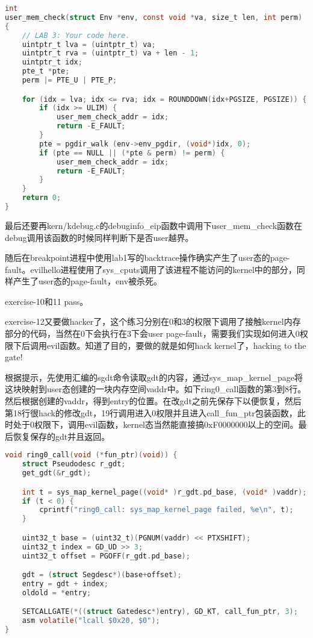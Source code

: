 \documentclass[11pt,a4paper]{article}
\begin{document}
\setmainfont{Consolas}
\begin{lstlisting}[language={C},firstnumber=1,title=kern/pmap.c]
int
user_mem_check(struct Env *env, const void *va, size_t len, int perm)
{
	// LAB 3: Your code here.
	uintptr_t lva = (uintptr_t) va;
	uintptr_t rva = (uintptr_t) va + len - 1;
	uintptr_t idx;
	pte_t *pte;
	perm |= PTE_U | PTE_P;

	for (idx = lva; idx <= rva; idx = ROUNDDOWN(idx+PGSIZE, PGSIZE)) {
		if (idx >= ULIM) {
			user_mem_check_addr = idx;
			return -E_FAULT;
		}
		pte = pgdir_walk (env->env_pgdir, (void*)idx, 0);
		if (pte == NULL || (*pte & perm) != perm) {
			user_mem_check_addr = idx;		
			return -E_FAULT;
		}
	}
	return 0;
}
\end{lstlisting}
\setmainfont[BoldFont=黑体]{宋体}

最后还要再kern/kdebug.c的debuginfo\_eip函数中调用下user\_mem\_check函数在debug调用该函数的时候同样判断下是否user越界。

随后在breakpoint进程中使用lab1写的backtrace操作确实产生了user态的page-fault。evilhello进程使用了sys\_cputs调用了该进程不能访问的kernel中的部分，同样产生了user态的page-fault，env被杀死。

exercise-10和11 pass。

exercise-12又要做hacker了，这个练习分别在0和3的权限下调用了接触kernel内存部分的代码，当然在0下会执行在3下会user page-fault，需要我们实现如何进入0权限下后调用evil函数。知道了目的，要做的就是如何hack kernel了，hacking to the gate!

根据提示，先使用汇编的sgdt命令读取gdt的内容，通过sys\_map\_kernel\_page将这块映射到user态创建的一块内存空间vaddr中。如下ring0\_call函数的第3到8行。然后根据创建的vaddr，得到entry的位置。在改gdt之前先保存下以便恢复，然后第18行很hack的修改gdt，19行调用进入0权限并且进入call\_fun\_ptr包装函数，此时处于0权限下，调用evil函数，kernel态当然能直接搞0xF0000000以上的空间。最后恢复保存的gdt并且返回。

\setmainfont{Consolas}
\begin{lstlisting}[language={C},firstnumber=1,title=user/evilhello2.c]
void ring0_call(void (*fun_ptr)(void)) {
    struct Pseudodesc r_gdt; 
	get_gdt(&r_gdt);

	int t = sys_map_kernel_page((void* )r_gdt.pd_base, (void* )vaddr);
	if (t < 0) {
		cprintf("ring0_call: sys_map_kernel_page failed, %e\n", t);
	}

	uint32_t base = (uint32_t)(PGNUM(vaddr) << PTXSHIFT);
	uint32_t index = GD_UD >> 3;
	uint32_t offset = PGOFF(r_gdt.pd_base);

	gdt = (struct Segdesc*)(base+offset); 
	entry = gdt + index; 
	oldold = *entry; 

	SETCALLGATE(*((struct Gatedesc*)entry), GD_KT, call_fun_ptr, 3);
	asm volatile("lcall $0x20, $0");
}
\end{lstlisting}
\setmainfont[BoldFont=黑体]{宋体}
\end{document}
